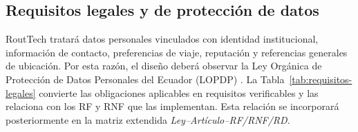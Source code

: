 \documentclass[12pt,a4paper]{article}
\begin{document}
\subsection{Requisitos legales y de protección de datos}

RoutTech tratará datos personales vinculados con identidad institucional, información de contacto, preferencias de viaje, reputación y referencias generales de ubicación. Por esta razón, el diseño deberá observar la Ley Orgánica de Protección de Datos Personales del Ecuador (LOPDP) \cite{lopdp2021}. La Tabla~\ref{tab:requisitos-legales} convierte las obligaciones aplicables en requisitos verificables y las relaciona con los RF y RNF que las implementan. Esta relación se incorporará posteriormente en la matriz extendida \emph{Ley--Artículo--RF/RNF/RD}.
\end{document}
